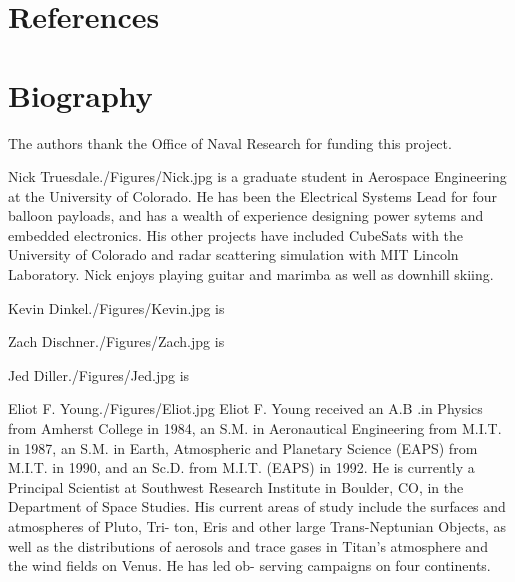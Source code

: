 \documentclass[twocolumn,letterpaper]{IEEEAerospace2012}
\newcommand{\rootdir}{./Figures/}
\begin{document}
\section{References}


\section{Biography}

\appendices

\acknowledgments
The authors thank the Office of Naval Research for funding this project.


\thebiography
\begin{biographywithjpg} 
{Nick Truesdale}{\rootdir Nick.jpg}
is a graduate student in Aerospace Engineering at the University of Colorado.
He has been the Electrical Systems Lead for four balloon payloads, and has a wealth of experience designing power sytems and embedded electronics. His other projects have included CubeSats with the University of Colorado and radar scattering simulation with MIT Lincoln Laboratory. Nick enjoys playing guitar and marimba as well as downhill skiing.   
\end{biographywithjpg}

\begin{biographywithjpg}{Kevin Dinkel}{\rootdir Kevin.jpg}
is
\end{biographywithjpg}

\begin{biographywithjpg}{Zach Dischner}{\rootdir Zach.jpg}
is
\end{biographywithjpg}

\begin{biographywithjpg}{Jed Diller}{\rootdir Jed.jpg}
is
\end{biographywithjpg}

\begin{biographywithjpg}{Eliot F. Young}{\rootdir Eliot.jpg}
Eliot F. Young received an A.B .in
Physics from Amherst College in 1984,
an S.M. in Aeronautical Engineering
from M.I.T. in 1987, an S.M. in Earth,
Atmospheric and Planetary Science
(EAPS) from M.I.T. in 1990, and an
Sc.D. from M.I.T. (EAPS) in 1992. He is
currently a Principal Scientist at
Southwest Research Institute in Boulder,
CO, in the Department of Space Studies. His current areas
of study include the surfaces and atmospheres of Pluto, Tri-
ton, Eris and other large Trans-Neptunian Objects, as well
as the distributions of aerosols and trace gases in Titan's
atmosphere and the wind fields on Venus. He has led ob-
serving campaigns on four continents.
\end{biographywithjpg}
\end{document}
